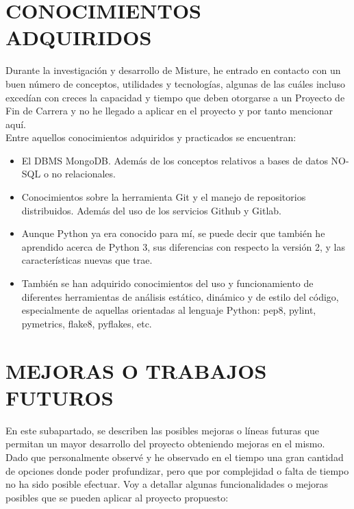 \newpage
\section{CONOCIMIENTOS ADQUIRIDOS}


Durante la investigación y desarrollo de Misture, he entrado en contacto con un buen número de conceptos, utilidades y tecnologías, algunas de las cuáles incluso excedían con creces la capacidad y tiempo que deben otorgarse a un Proyecto de Fin de Carrera y no he llegado a aplicar en el proyecto y por tanto mencionar aquí.\\


Entre aquellos conocimientos adquiridos y practicados se encuentran:\\


\begin{itemize}
\item El DBMS MongoDB. Además de los conceptos relativos a bases de datos NO-SQL o no relacionales.\\

\item Conocimientos sobre la herramienta Git y el manejo de repositorios distribuidos. Además del uso de los servicios Github y Gitlab.\\

\item Aunque Python ya era conocido para mí, se puede decir que también he aprendido acerca de Python 3, sus diferencias con respecto la versión 2, y las características nuevas que trae.\\

\item También se han adquirido conocimientos del uso y funcionamiento de diferentes herramientas de análisis estático, dinámico y de estilo del código, especialmente de aquellas orientadas al lenguaje Python: pep8, pylint, pymetrics, flake8, pyflakes, etc.

\end{itemize}

\newpage
\section{MEJORAS O TRABAJOS FUTUROS}


En este subapartado, se describen las posibles mejoras o líneas futuras que permitan un mayor desarrollo del proyecto obteniendo mejoras en el mismo.\\


Dado que personalmente observé y he observado en el tiempo una gran cantidad de opciones donde poder profundizar, pero que por complejidad o falta de tiempo no ha sido posible efectuar. Voy a detallar algunas funcionalidades o mejoras posibles que se pueden aplicar al proyecto propuesto:\\


